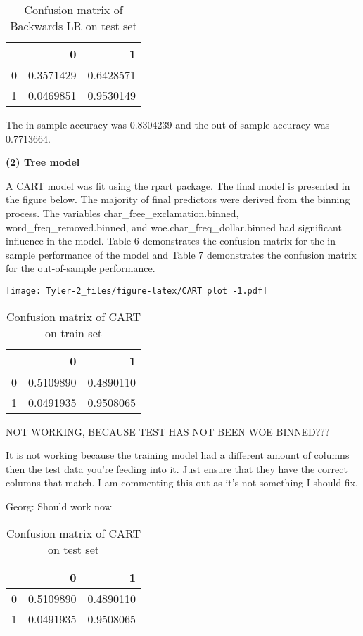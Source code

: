 \documentclass[12pt,]{article}
\begin{document}
\begin{table}[t]

\caption{\label{tab:Conf matrix test}Confusion matrix of Backwards LR on test set}
\centering
\begin{tabular}{lrr}
\toprule
  & 0 & 1\\
\midrule
\rowcolor{gray!6}  0 & 0.3571429 & 0.6428571\\
1 & 0.0469851 & 0.9530149\\
\bottomrule
\end{tabular}
\end{table}

The in-sample accuracy was 0.8304239 and the out-of-sample accuracy was
0.7713664.

\pagebreak

\textbf{(2) Tree model}

A CART model was fit using the rpart package. The final model is
presented in the figure below. The majority of final predictors were
derived from the binning process. The variables
char\_free\_exclamation.binned, word\_freq\_removed.binned, and
woe.char\_freq\_dollar.binned had significant influence in the model.
Table 6 demonstrates the confusion matrix for the in-sample performance
of the model and Table 7 demonstrates the confusion matrix for the
out-of-sample performance.

\texttt{[image: Tyler-2\_files/figure-latex/CART plot -1.pdf]}

\begin{table}[t]

\caption{\label{tab:conf matrix train cart}Confusion matrix of CART on train set}
\centering
\begin{tabular}{lrr}
\toprule
  & 0 & 1\\
\midrule
\rowcolor{gray!6}  0 & 0.5109890 & 0.4890110\\
1 & 0.0491935 & 0.9508065\\
\bottomrule
\end{tabular}
\end{table}

NOT WORKING, BECAUSE TEST HAS NOT BEEN WOE BINNED???

It is not working because the training model had a different amount of
columns then the test data you're feeding into it. Just ensure that they
have the correct columns that match. I am commenting this out as it's
not something I should fix.

Georg: Should work now

\begin{table}[t]

\caption{\label{tab:CART test conf matrix}Confusion matrix of CART on test set}
\centering
\begin{tabular}{lrr}
\toprule
  & 0 & 1\\
\midrule
\rowcolor{gray!6}  0 & 0.5109890 & 0.4890110\\
1 & 0.0491935 & 0.9508065\\
\bottomrule
\end{tabular}
\end{table}
\end{document}
